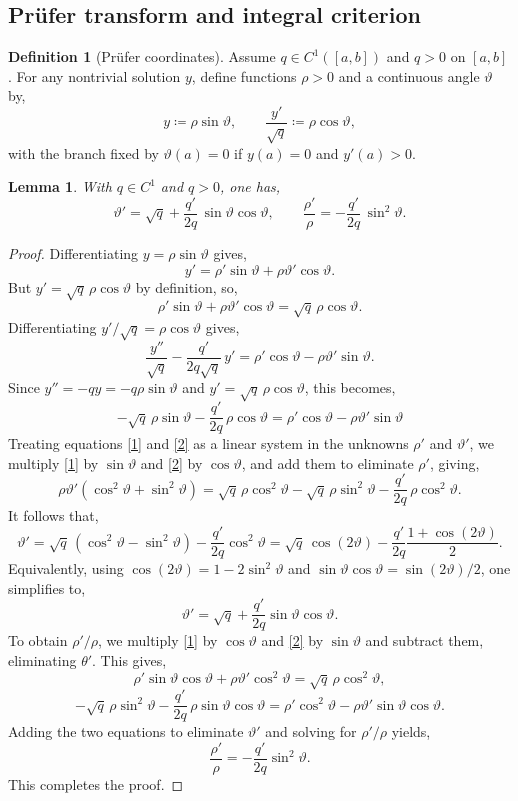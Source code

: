 \documentclass[a4paper, reqno]{amsart}
\numberwithin{equation}{section}
\theoremstyle{plain}
\newtheorem{lemma}[theorem]{Lemma}
\theoremstyle{definition}
\newtheorem{definition}[theorem]{Definition}
\theoremstyle{remark}
\begin{document}
\subsection{Prüfer transform and integral criterion}

\begin{definition}[Prüfer coordinates]\label{def:pruefer}
Assume $q\in C^1([a,b])$ and $q>0$ on $[a,b]$. For any nontrivial solution $y$, define functions $\rho>0$ and a continuous angle $\vartheta$ by,
$$y\coloneqq\rho\sin\vartheta,\qquad \frac{y'}{\sqrt{q}}\coloneqq \rho\cos\vartheta,$$
with the branch fixed by $\vartheta(a)=0$ if $y(a)=0$ and $y'(a)>0$.
\end{definition}

\begin{lemma}\label{lem:pruefer-ode}
With $q\in C^1$ and $q>0$, one has,
$$\vartheta'=\sqrt{q}+\frac{q'}{2q}\,\sin\vartheta\cos\vartheta,\qquad\frac{\rho'}{\rho}=-\frac{q'}{2q}\,\sin^2\vartheta.$$
\end{lemma}
\begin{proof}
Differentiating $y=\rho\sin\vartheta$ gives,
$$y'=\rho'\sin\vartheta+\rho\vartheta'\cos\vartheta.$$
But $y'=\sqrt{q}\,\rho\cos\vartheta$ by definition, so,
\begin{equation}\label{1} \rho'\sin\vartheta+\rho\vartheta'\cos\vartheta=\sqrt{q}\,\rho\cos\vartheta.
\end{equation}
Differentiating $y'/\sqrt{q}=\rho\cos\vartheta$ gives,
$$\frac{y''}{\sqrt{q}}-\frac{q'}{2q\sqrt{q}}\,y'=\rho'\cos\vartheta-\rho\vartheta'\sin\vartheta.$$
Since $y''=-q y=-q\rho\sin\vartheta$ and $y'=\sqrt{q}\,\rho\cos\vartheta$, this becomes,
\begin{equation}\label{2}
    -\sqrt{q}\,\rho\sin\vartheta - \frac{q'}{2q}\,\rho\cos\vartheta = \rho'\cos\vartheta-\rho\vartheta'\sin\vartheta
\end{equation}
Treating equations \eqref{1} and \eqref{2} as a linear system in the unknowns $\rho'$ and $\vartheta'$, we multiply \eqref{1} by $\sin\vartheta$ and \eqref{2} by $\cos\vartheta$, and add them to eliminate $\rho'$, giving,
$$\rho\vartheta'(\cos^2\vartheta+\sin^2\vartheta)= \sqrt{q}\,\rho\cos^2\vartheta - \sqrt{q}\,\rho\sin^2\vartheta - \frac{q'}{2q}\,\rho\cos^2\vartheta.$$
It follows that,
$$\vartheta'=\sqrt{q}\,(\cos^2\vartheta-\sin^2\vartheta)-\frac{q'}{2q}\cos^2\vartheta=\sqrt{q}\,\cos(2\vartheta)-\frac{q'}{2q}\frac{1+\cos(2\vartheta)}{2}.$$
Equivalently, using $\cos(2\vartheta)=1-2\sin^2\vartheta$ and $\sin\vartheta\cos\vartheta=\sin(2\vartheta)/2$, one simplifies to,
$$\vartheta'=\sqrt{q}+\frac{q'}{2q}\sin\vartheta\cos\vartheta.$$
To obtain $\rho'/\rho$, we multiply \eqref{1} by $\cos\vartheta$ and \eqref{2} by $\sin\vartheta$ and subtract them, eliminating $\theta'$. This gives,
$$\rho'\sin\vartheta\cos\vartheta+\rho\vartheta'\cos^2\vartheta= \sqrt{q}\,\rho\cos^2\vartheta,$$
$$-\sqrt{q}\,\rho\sin^2\vartheta - \frac{q'}{2q}\,\rho\sin\vartheta\cos\vartheta= \rho'\cos^2\vartheta-\rho\vartheta'\sin\vartheta\cos\vartheta.$$
Adding the two equations to eliminate $\vartheta'$ and solving for $\rho'/\rho$ yields,
$$\frac{\rho'}{\rho}=-\frac{q'}{2q}\sin^2\vartheta.$$
This completes the proof.

\end{proof}
\end{document}
